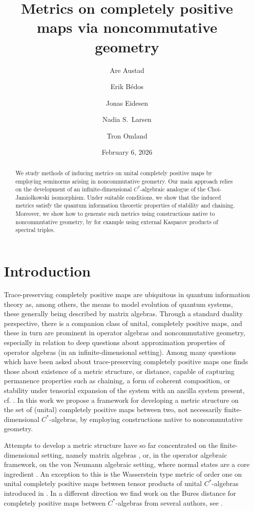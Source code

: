 \documentclass[11pt, a4paper, oneside, final, reqno]{amsart}
\title[]{Metrics on completely positive maps via noncommutative geometry}
\date{February 6, 2026}
\author[1]{Are Austad}
\author[2]{Erik B\'edos}
\author[3]{Jonas Eidesen}
\author[4]{Nadia S.~Larsen}
\author[5]{Tron Omland}
\theoremstyle{definition}
\theoremstyle{plain}
\theoremstyle{remark}
\numberwithin{equation}{section}
\begin{document}
\begin{abstract}
    We study methods of inducing metrics on unital completely positive maps by employing seminorms arising in noncommutative geometry. Our main approach relies on the development of an infinite-dimensional $C^*$-algebraic analogue of the Choi-Jamio\l{}kowski isomorphism. Under suitable conditions, we show that the induced metrics satisfy the quantum information theoretic properties of stability and chaining. Moreover, we show how to generate such metrics using constructions native to noncommutative geometry, by for example using external Kasparov products of spectral triples.
\end{abstract}

\maketitle

\section{Introduction}

Trace-preserving completely positive maps are ubiquitous in quantum information theory as, among others, the means to model evolution of quantum systems, these generally being described by matrix algebras. Through a standard duality perspective, there is a companion class of unital, completely positive maps, and these in turn are prominent in operator algebras and noncommutative geometry, especially in relation to deep questions about approximation properties of operator algebras (in an infinite-dimensional setting).  Among many questions which have been asked about trace-preserving completely positive maps one finds those about existence of a metric structure, or distance, capable of capturing permanence properties such as chaining, a form of coherent composition, or stability under tensorial expansion of the system with an ancilla system present, cf. \cite{Gilchrist, BorovykVellambi25}. In this work we propose a framework for developing a metric structure on the set of (unital) completely positive maps between two, not necessarily finite-dimensional $C^*$-algebras, by employing constructions native to noncommutative geometry.

Attempts to develop a metric structure have so far concentrated on the finite-dimensional setting, namely matrix algebras \cite{Gilchrist, BorovykVellambi25}, or, in the operator algebraic framework, on the von Neumann algebraic setting, where normal states are a core ingredient \cite{AnshuJekelLandry25, AraizaJungeWu25, DawsQuantumGraphs25}. An exception to this is the Wasserstein type metric of order one on unital completely positive maps between tensor products of unital $C^*$-algebras introduced in \cite{DM23}. In a different direction we find work on the Bures distance for completely positive maps between $C^*$-algebras from several authors, see \cite{KretschmannSchlingemannWerner2008,BhatSumesh2013}.
\end{document}
